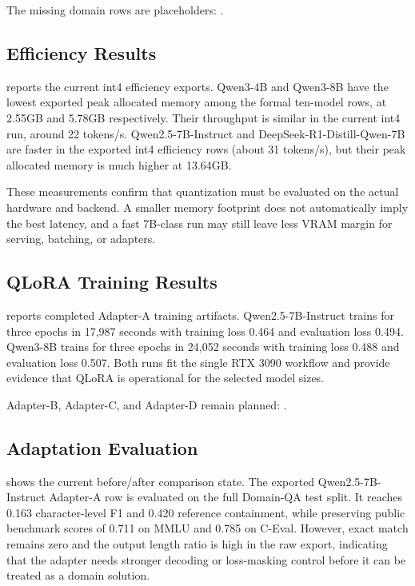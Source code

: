 

The missing domain rows are placeholders:
.

\subsection{Efficiency Results}

 reports the current int4 efficiency exports.
Qwen3-4B and Qwen3-8B have the lowest exported peak allocated memory among the
formal ten-model rows, at 2.55GB and 5.78GB respectively. Their throughput is
similar in the current int4 run, around 22 tokens/s. Qwen2.5-7B-Instruct and
DeepSeek-R1-Distill-Qwen-7B are faster in the exported int4 efficiency rows
(about 31 tokens/s), but their peak allocated memory is much higher at 13.64GB.



These measurements confirm that quantization must be evaluated on the actual
hardware and backend. A smaller memory footprint does not automatically imply
the best latency, and a fast 7B-class run may still leave less VRAM margin for
serving, batching, or adapters.

\subsection{QLoRA Training Results}

 reports completed Adapter-A training
artifacts. Qwen2.5-7B-Instruct trains for three epochs in 17,987 seconds with
training loss 0.464 and evaluation loss 0.494. Qwen3-8B trains for three
epochs in 24,052 seconds with training loss 0.488 and evaluation loss 0.507.
Both runs fit the single RTX 3090 workflow and provide evidence that QLoRA is
operational for the selected model sizes.



Adapter-B, Adapter-C, and Adapter-D remain planned:
.

\subsection{Adaptation Evaluation}

 shows the current before/after comparison state. The
exported Qwen2.5-7B-Instruct Adapter-A row is evaluated on the full Domain-QA
test split. It reaches 0.163 character-level F1 and 0.420 reference
containment, while preserving public benchmark scores of 0.711 on MMLU and
0.785 on C-Eval. However, exact match remains zero and the output length ratio
is high in the raw export, indicating that the adapter needs stronger decoding
or loss-masking control before it can be treated as a domain solution.

